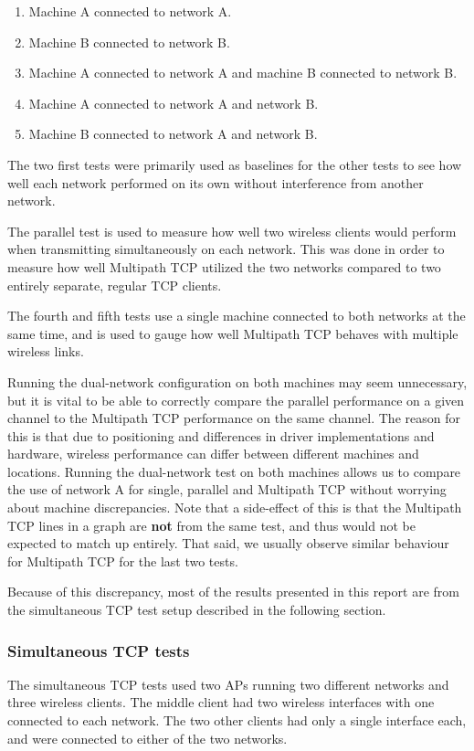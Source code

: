 \begin{enumerate}
  \item Machine A connected to network A.
  \item Machine B connected to network B.
  \item Machine A connected to network A and machine B connected to network B.
  \item Machine A connected to network A and network B.
  \item Machine B connected to network A and network B.
\end{enumerate}

The two first tests were primarily used as baselines for the other tests to see
how well each network performed on its own without interference from another
network.

The parallel test is used to measure how well two wireless clients would perform
when transmitting simultaneously on each network. This was done in order to
measure how well Multipath TCP utilized the two networks compared to two
entirely separate, regular TCP clients.

The fourth and fifth tests use a single machine connected to both networks at
the same time, and is used to gauge how well Multipath TCP behaves with multiple
wireless links.

Running the dual-network configuration on both machines may seem unnecessary,
but it is vital to be able to correctly compare the parallel performance on a
given channel to the Multipath TCP performance on the same channel. The reason
for this is that due to positioning and differences in driver implementations
and hardware, wireless performance can differ between different machines and
locations. Running the dual-network test on both machines allows us to compare
the use of network A for single, parallel and Multipath TCP without worrying
about machine discrepancies. Note that a side-effect of this is that the
Multipath TCP lines in a graph are \textbf{not} from the same test, and thus
would not be expected to match up entirely. That said, we usually observe
similar behaviour for Multipath TCP for the last two tests.

Because of this discrepancy, most of the results presented in this report are
from the simultaneous TCP test setup described in the following section.

\subsubsection{Simultaneous TCP tests}
\label{sec:met:setups:simtcp}
The simultaneous TCP tests used two APs running two different networks and three
wireless clients. The middle client had two wireless interfaces with one
connected to each network. The two other clients had only a single interface
each, and were connected to either of the two networks.

